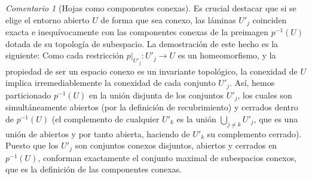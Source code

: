\documentclass[11pt,a4paper]{article}
\theoremstyle{definition}
\theoremstyle{remark}
\newtheorem{observacion}{Comentario}[section]
\numberwithin{equation}{section}
\begin{document}
\begin{observacion}[Hojas como componentes conexas]
Es crucial destacar que si se elige el entorno abierto $U$ de forma que sea conexo, las láminas $U'_j$ coinciden exacta e inequívocamente con las componentes conexas de la preimagen $p^{-1}(U)$ dotada de su topología de subespacio. 
La demostración de este hecho es la siguiente: Como cada restricción $p|_{U'_j}: U'_j \to U$ es un homeomorfismo, y la propiedad de ser un espacio conexo es un invariante topológico, la conexidad de $U$ implica irremediablemente la conexidad de cada conjunto $U'_j$. Así, hemos particionado $p^{-1}(U)$ en la unión disjunta de los conjuntos $U'_j$, los cuales son simultáneamente abiertos (por la definición de recubrimiento) y cerrados dentro de $p^{-1}(U)$ (el complemento de cualquier $U'_k$ es la unión $\bigcup_{j \neq k} U'_j$, que es una unión de abiertos y por tanto abierta, haciendo de $U'_k$ su complemento cerrado). Puesto que los $U'_j$ son conjuntos conexos disjuntos, abiertos y cerrados en $p^{-1}(U)$, conforman exactamente el conjunto maximal de subespacios conexos, que es la definición de las componentes conexas.
\end{observacion}
\end{document}
